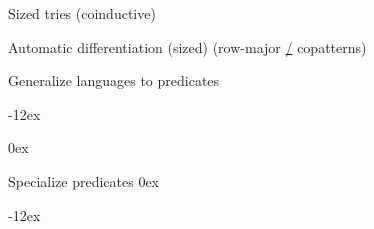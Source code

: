 \documentclass[aspectratio=169]{beamer}
\begin{document}
\rnc{}

\begin{frame}{Sized tries \hfill (coinductive)}
\vspace{-1.5ex}
\vspace{2ex}
\end{frame}

\begin{frame}{Automatic differentiation (sized) \hfill (row-major \hyperlink{automatic-diff}{/} copatterns)}
\vspace{-1.75ex}
\end{frame}


\rnc{}

\begin{comment}
\begin{frame}{Two kinds of language operations}
Codomain transformations: \AF{∅}, \AF 𝒰, \AF{\_∪\_}, \AF{\_∩\_}

Domain transformations: \AF{𝟏}, \AF{\_⋆\_}, \AF{\_☆}
\end{frame}
\end{comment}

\begin{frame}{Generalize languages to predicates}
\begin{center}
\mathindent-12ex
\end{center}
\vspace{-2ex}
\hfill
\mathindent0ex
\begin{minipage}[b]{16em}
{}
\end{minipage}
\hfill
\begin{minipage}[b]{22em}
{}
\end{minipage}
\hfill\;
\end{frame}

\begin{frame}{Specialize predicates}
\mathindent0ex
\begin{center}
\mathindent-12ex
\end{center}
\vspace{-2ex}
\hfill
\begin{minipage}[c]{11em}
\end{minipage}
\hfill
\begin{minipage}[c]{15em}
\end{minipage}
\hfill\;
\end{frame}
\end{document}
